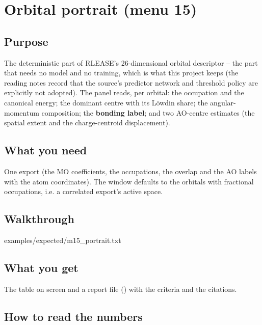\chapter{Orbital portrait (menu 15)}
\label{ch:menu15}

\section{Purpose}

The deterministic part of RLEASE's 26-dimensional orbital descriptor -- the part
that needs no model and no training, which is what this project keeps (the
reading notes record that the source's predictor network and threshold policy
are explicitly not adopted).  The panel reads, per orbital: the occupation and
the canonical energy; the dominant centre with its L\"owdin share; the
angular-momentum composition; the \textbf{bonding label}; and two AO-centre
estimates (the spatial extent and the charge-centroid displacement).

\section{What you need}

One  export (the MO coefficients, the occupations, the overlap
and the AO labels with the atom coordinates).  The window defaults to the
orbitals with fractional occupations, i.e. a correlated export's active space.

\section{Walkthrough}


  {examples/expected/m15_portrait.txt}

\section{What you get}

The table on screen and a report file () with the
criteria and the citations.

\section{How to read the numbers}

